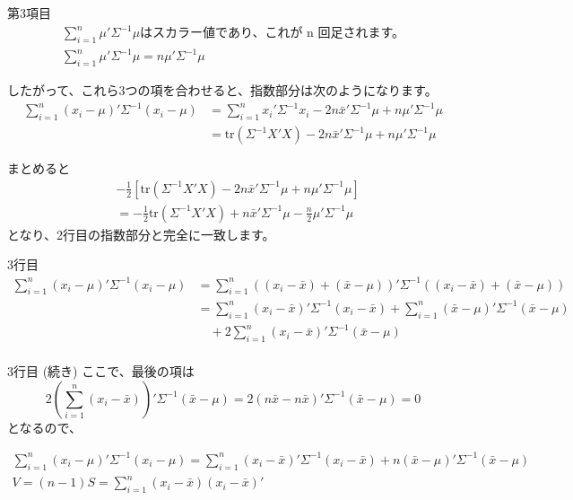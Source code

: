 \documentclass[aspectratio=169]{beamer}
\begin{document}
\begin{frame}{第3項目}
\begin{align*}
\sum_{i=1}^n \mu'\Sigma^{-1}\mu\text{はスカラー値であり、これが n 回足されます。}\\
\sum_{i=1}^n \mu'\Sigma^{-1}\mu 
= n\mu'\Sigma^{-1}\mu
\end{align*}

したがって、これら3つの項を合わせると、指数部分は次のようになります。
\begin{align*}
\sum_{i=1}^n (x_i - \mu)'\Sigma^{-1}(x_i - \mu)
&= \sum_{i=1}^n x_i'\Sigma^{-1}x_i - 2n\bar{x}'\Sigma^{-1}\mu + n\mu'\Sigma^{-1}\mu \\
&= \mathrm{tr}(\Sigma^{-1} X'X) - 2n\bar{x}'\Sigma^{-1}\mu + n\mu'\Sigma^{-1}\mu
\end{align*}

\end{frame}

\begin{frame}{まとめると}
    \begin{align*}
    & -\frac{1}{2} \left[ \mathrm{tr}(\Sigma^{-1} X'X) - 2n\bar{x}'\Sigma^{-1}\mu + n\mu'\Sigma^{-1}\mu \right] \\
    &= -\frac{1}{2} \mathrm{tr}(\Sigma^{-1} X'X) + n\bar{x}'\Sigma^{-1}\mu - \frac{n}{2} \mu'\Sigma^{-1}\mu
    \end{align*}
    となり、2行目の指数部分と完全に一致します。
\end{frame}

\begin{frame}{3行目}
\begin{align*}
\sum_{i=1}^n (x_i - \mu)' \Sigma^{-1} (x_i - \mu)
&= \sum_{i=1}^n \left( (x_i - \bar{x}) + (\bar{x} - \mu) \right)' \Sigma^{-1} \left( (x_i - \bar{x}) + (\bar{x} - \mu) \right) \\
&= \sum_{i=1}^n (x_i - \bar{x})' \Sigma^{-1} (x_i - \bar{x}) + \sum_{i=1}^n (\bar{x} - \mu)' \Sigma^{-1} (\bar{x} - \mu) \\
&\quad + 2\sum_{i=1}^n (x_i - \bar{x})' \Sigma^{-1} (\bar{x} - \mu)\\
\end{align*}
\end{frame}

\begin{frame}{3行目 (続き)}
ここで、最後の項は
\[
2\left(\sum_{i=1}^n (x_i - \bar{x})\right)' \Sigma^{-1} (\bar{x} - \mu) = 2(n\bar{x} - n\bar{x})' \Sigma^{-1} (\bar{x} - \mu) = 0
\]
となるので、

\begin{align*}
\sum_{i=1}^n (x_i - \mu)' \Sigma^{-1} (x_i - \mu)
= \sum_{i=1}^n (x_i - \bar{x})' \Sigma^{-1} (x_i - \bar{x}) + n(\bar{x} - \mu)' \Sigma^{-1} (\bar{x} - \mu)\\
V = (n-1)S = \sum_{i=1}^n (x_i - \bar{x})(x_i - \bar{x})'
\end{align*}
\end{frame}
\end{document}
